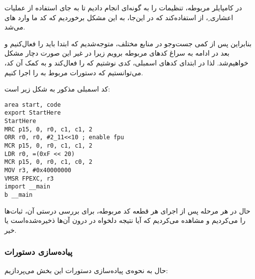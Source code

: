 در کامپایلر مربوطه، تنظیمات را به گونه‌ای انجام دادیم تا به جای استفاده از عملیات اعشاری
ِ،
 از
  استفاده‌کند که در این‌جا، به این مشکل برخوردیم که کد ما وارد 
های
 می‌شد.

بنابراین پس از کمی جست‌وجو در منابع مختلف، متوجه‌شدیم که ابتدا باید
 را فعال‌کنیم و بعد در ادامه به سراغ کدهای مربوطه برویم زیرا در غیر این صورت دچار مشکل خواهیم‌شد. لذا در ابتدای کدهای اسمبلی، کدی نوشتیم که
  را فعال‌کند و به کمک آن کد، می‌توانستیم که دستورات مربوط به
 را اجرا کنیم.
 
 کد اسمبلی مذکور به شکل زیر است:
\begin{latin}
\begin{verbatim}
area start, code
export StartHere
StartHere
MRC p15, 0, r0, c1, c1, 2
ORR r0, r0, #2_11<<10 ; enable fpu
MCR p15, 0, r0, c1, c1, 2
LDR r0, =(0xF << 20)
MCR p15, 0, r0, c1, c0, 2
MOV r3, #0x40000000
VMSR FPEXC, r3
import __main
b __main
\end{verbatim}
\end{latin}
  
  حال در هر مرحله پس از اجرای هر قطعه کد مربوطه، برای بررسی درستی آن، ثبات‌ها را
   می‌کردیم و مشاهده می‌کردیم که آیا نتیجه دلخواه در درون آن‌ها ذخیره‌شده‌است یا خیر.
  

\subsubsection*{پیاده‌سازی دستورات}
حال به نحوه‌ی پیاده‌سازی دستورات این بخش می‌پردازیم:

